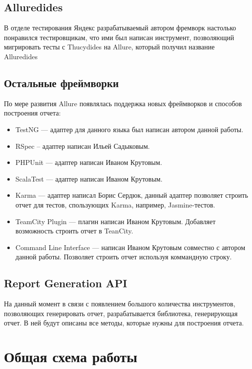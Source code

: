 \subsection{Alluredides}

В отделе тестирования Яндекс разрабатываемый автором фремворк настолько понравился тестировщикам, что ими был написан инструмент, позволяющий мигрировать тесты с Thucydides на Allure, который получил название Alluredides

\subsection{Остальные фреймворки}

По мере развития Allure появлялась поддержка новых фреймворков и способов построения отчета:

\begin{itemize}
\item TestNG --- адаптер для данного языка был написан автором данной работы.
\item RSpec -- адаптер написан Ильей Садыковым.
\item PHPUnit --- адаптер написан Иваном Крутовым.
\item ScalaTest --- адаптер написан Иваном Крутовым.
\item Karma --- адаптер написал Борис Сердюк, данный адаптер позволяет строить отчет для тестов, спользующих Karma, например, Jasmine-тестов.
\item TeamCity Plugin --- плагин написан Иваном Крутовым. Добавляет возможность строить отчет в TeanCity.
\item Command Line Interface --- написан Иваном Крутовым совместно с автором данной работы. Позволяет строить отчет используя коммандную строку.
\end{itemize}

\subsection{Report Generation API}

На данный момент в связи с появлением большого количества инструментов, позволяющих генерировать отчет, разрабатывается библиотека, генерирующая отчет. В ней будут описаны все методы, которые нужны для построения отчета. 

\section{Общая схема работы} 

